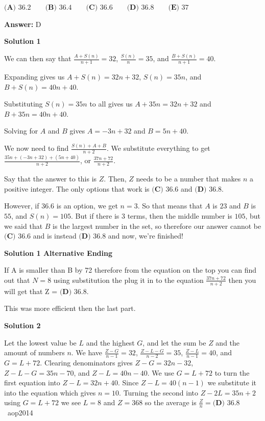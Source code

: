 \begin{enumerate}
 $\textbf{(A) }36.2 \qquad \textbf{(B) }36.4 \qquad \textbf{(C) }36.6\qquad \textbf{(D) }36.8 \qquad \textbf{(E) }37$

 \textbf{Answer: }D



\textbf{Solution 1}

We can then say that \( \frac{A+S(n)}{n+1} = 32 \), \( \frac{S(n)}{n} = 35 \), and \( \frac{B+S(n)}{n+1} = 40 \). 

 Expanding gives us \( A+S(n) = 32n+32 \), \( S(n) = 35n \), and \( B+S(n) = 40n+40 \). 

 Substituting \( S(n) = 35n \) to all gives us \( A+35n=32n+32 \) and \( B+35n=40n+40 \). 

 Solving for \( A \) and \( B \) gives \( A=-3n+32 \) and \( B = 5n+40 \). 

 We now need to find \( \frac{S(n)+A+B}{n+2} \). We substitute everything to get \( \frac{35n+(-3n+32)+(5n+40)}{n+2} \), or \( \frac{37n+72}{n+2} \). 

 Say that the answer to this is \( Z \). Then, \( Z \) needs to be a number that makes \( n \) a positive integer. The only options that work is $\boxed{\textbf{(C) }36.6}$ and $\boxed{\textbf{(D) }36.8}$. 

 However, if 36.6 is an option, we get \( n=3 \). So that means that \(A\) is \(23\) and \(B\) is \(55\), and \( S(n)=105 \). But if there is \(3\) terms, then the middle number is \(105\), but we said that \( B \) is the largest number in the set, so therefore our answer cannot be $\boxed{\textbf{(C) }36.6}$ and is instead $\boxed{\textbf{(D) }36.8}$ and now, we're finished!

 



\textbf{Solution 1 Alternative Ending}

If A is smaller than B by 72 therefore from the equation on the top you can find out that \(N = 8\) using substitution the plug it in to the equation \( \frac{37n+72}{n+2} \) then you will get that Z = $\boxed{\textbf{(D) }36.8}$. 

 This was more efficient then the last part.

 



\textbf{Solution 2}

Let the lowest value be $L$ and the highest $G$, and let the sum be $Z$ and the amount of numbers $n$. We have $\frac{Z-G}{n-1}=32$, $\frac{Z-L-G}{n-2}=35$, $\frac{Z-L}{n-1}=40$, and $G=L+72$. Clearing denominators gives $Z-G=32n-32$, $Z-L-G=35n-70$, and $Z-L=40n-40$. We use $G=L+72$ to turn the first equation into $Z-L=32n+40$. Since $Z-L=40(n-1)$ we substitute it into the equation which gives $n=10$. Turning the second into $Z-2L=35n+2$ using $G=L+72$ we see $L=8$ and $Z=368$ so the average is $\frac{Z}{n}=\boxed{\textbf{(D) }36.8}$ ~aop2014


\end{enumerate}
